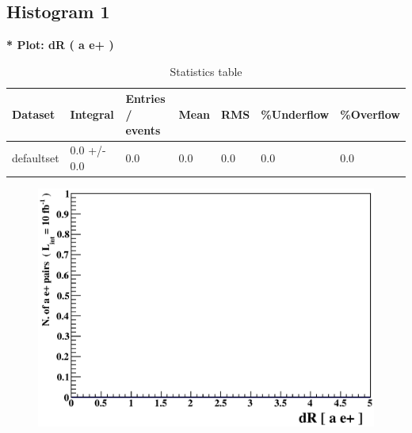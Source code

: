 \documentclass[a4paper, 11pt]{article}
\begin{document}
\subsection{ Histogram 1}

   \textbf{   * Plot: dR ( a e+ ) }
\textbf{ }\begin{table}[!h]
  \begin{center}
    \caption{ Statistics table}
    \begin{tabular}{|m{17.0mm}|m{27.0mm}|m{23.0mm}|m{18.0mm}|m{18.0mm}|m{14.0mm}|m{14.0mm}|}
      \hline
      \cellcolor{yellow}         Dataset& \cellcolor{yellow}         Integral& \cellcolor{yellow}         Entries /\- events& \cellcolor{yellow}         Mean& \cellcolor{yellow}         RMS& \cellcolor{yellow}         \%Underflow& \cellcolor{yellow}         \%Overflow\\
      \hline
      \cellcolor{white}         defaultset& \cellcolor{white}         0.0 +/\-- 0.0& \cellcolor{white}         0.0& \cellcolor{white}         0.0& \cellcolor{white}         0.0& \cellcolor{green}         0.0& \cellcolor{green}         0.0\\
\hline
    \end{tabular}
  \end{center}
\end{table}

\begin{figure}[!h]
  \begin{center}
    \includegraphics[scale=0.6]{selection_0.eps}\\
\caption{}
  \end{center}
\end{figure}
\newpage
   \newpage
\end{document}
